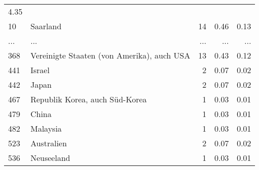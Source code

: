 \begin{longtable}{lXrrr}
          \num[round-mode=places,round-precision=2]{4.35} \\
        10 & \multicolumn{1}{X}{Saarland} & %
          \num{14} &
          \num[round-mode=places,round-precision=2]{0.46} &
          \num[round-mode=places,round-precision=2]{0.13} \\
       ... & ... & ... & ... & ... \\
        368 & \multicolumn{1}{X}{Vereinigte Staaten (von Amerika), auch USA} & %
          \num{13} &
          \num[round-mode=places,round-precision=2]{0.43} &
          \num[round-mode=places,round-precision=2]{0.12} \\

        441 & \multicolumn{1}{X}{Israel} & %
          \num{2} &
          \num[round-mode=places,round-precision=2]{0.07} &
          \num[round-mode=places,round-precision=2]{0.02} \\

        442 & \multicolumn{1}{X}{Japan} & %
          \num{2} &
          \num[round-mode=places,round-precision=2]{0.07} &
          \num[round-mode=places,round-precision=2]{0.02} \\

        467 & \multicolumn{1}{X}{Republik Korea, auch Süd-Korea} & %
          \num{1} &
          \num[round-mode=places,round-precision=2]{0.03} &
          \num[round-mode=places,round-precision=2]{0.01} \\

        479 & \multicolumn{1}{X}{China} & %
          \num{1} &
          \num[round-mode=places,round-precision=2]{0.03} &
          \num[round-mode=places,round-precision=2]{0.01} \\

        482 & \multicolumn{1}{X}{Malaysia} & %
          \num{1} &
          \num[round-mode=places,round-precision=2]{0.03} &
          \num[round-mode=places,round-precision=2]{0.01} \\

        523 & \multicolumn{1}{X}{Australien} & %
          \num{2} &
          \num[round-mode=places,round-precision=2]{0.07} &
          \num[round-mode=places,round-precision=2]{0.02} \\

        536 & \multicolumn{1}{X}{Neuseeland} & %
          \num{1} &
          \num[round-mode=places,round-precision=2]{0.03} &
          \num[round-mode=places,round-precision=2]{0.01} \\


\end{longtable}
